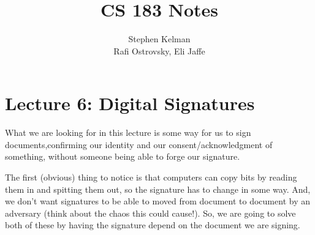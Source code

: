 \documentclass[11pt]{article}
\title{CS 183 Notes}
\author{Stephen Kelman\\ Rafi Ostrovsky, Eli Jaffe}
\begin{document}
\section{Lecture 6: Digital Signatures}

What we are looking for in this lecture is some way for us to sign documents,confirming our identity and our consent/acknowledgment of something, without someone being able to forge our signature.\smallskip

The first (obvious) thing to notice is that computers can copy bits by reading them in and spitting them out, so the signature has to change in some way. And, we don't want signatures to be able to moved from document to document by an adversary (think about the chaos this could cause!). So, we are going to solve both of these by having the signature depend on the document we are signing.
\end{document}
